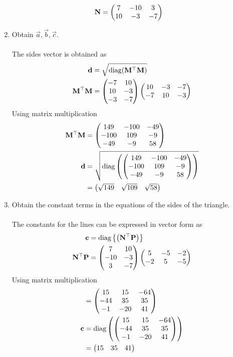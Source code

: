 \documentclass[10pt]{book}
\begin{document}
\begin{enumerate}[label=\thesubsection.\arabic*.,ref=\thesubsection.\theenumi]
\begin{align}
   \mathbf{N} &= \begin{pmatrix}7 & -10 & 3 \\ 10 & -3 & -7\end{pmatrix}
\end{align}
\item Obtain $\vec{a}, \vec{b}, \vec{c}$. \\
\solution \\
The sides vector is obtained as
\begin{align}
\mathbf{d} &= \sqrt{\text{diag}(\mathbf{M}^{\top}\mathbf{M})}\\
\mathbf{M}^{\top}\mathbf{M} &= \begin{pmatrix}-7 &10 \\ 10 &-3 \\ -3&-7\end{pmatrix}\begin{pmatrix}10 & -3 & -7 \\ -7 & 10 & -3\end{pmatrix}
\end{align} 
Using matrix multiplication 
\begin{align}
    \mathbf{M}^{\top}\mathbf{M} &= \begin{pmatrix} 149 & -100 & -49 \\ -100 & 109 & -9 \\ -49 & -9 & 58\end{pmatrix} \\
    \mathbf{d} &= \sqrt{\text{diag}\left(\begin{pmatrix} 149 & -100 & -49 \\ -100 & 109 & -9 \\ -49 & -9 & 58\end{pmatrix}\right)} \\
    &= \begin{pmatrix} \sqrt{149} & \sqrt{109} & \sqrt{58}\end{pmatrix}
\end{align}
\item Obtain the constant terms in the equations of the sides of the triangle.\\
\solution \\The constants for the lines can be expressed in vector form as
\begin{align}
\mathbf{c} &= \text{diag}\left\{\left(\mathbf{N}^{\top}\mathbf{P}\right)\right\}  \\
\mathbf{N}^{\top}\mathbf{P} &= \begin{pmatrix}7&10 \\ -10&-3 \\ 3 &-7\end{pmatrix}\begin{pmatrix}5 & -5 & -2 \\ -2 & 5 & -5\end{pmatrix} \\
\end{align}
Using matrix multiplication
\begin{align}
    &=\begin{pmatrix} 15 & 15 & -64 \\ -44 & 35 & 35 \\ -1 & -20 & 41 \end{pmatrix} \\
    \mathbf{c} &= \text{diag}\left( \begin{pmatrix} 15 & 15 & -64 \\ -44 & 35 & 35 \\ -1 & -20 & 41 \end{pmatrix}\right) \\
    &= \begin{pmatrix} 15 & 35 & 41\end{pmatrix}
\end{align}
\end{enumerate}
\end{document}
